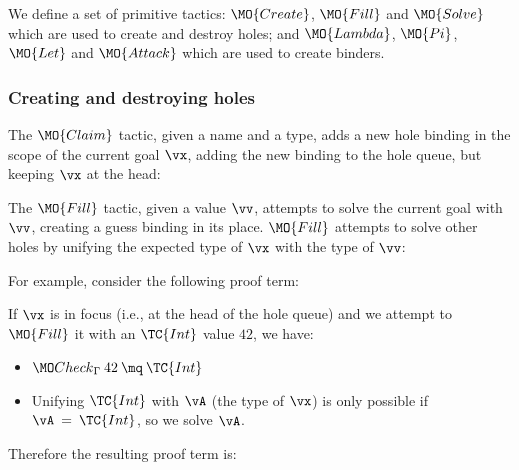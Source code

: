 We define a set of primitive tactics: $\MO{Create}$, $\MO{Fill}$ and $\MO{Solve}$
which are used to create and destroy holes; and $\MO{Lambda}$, $\MO{Pi}$, $\MO{Let}$
and $\MO{Attack}$ which are used to create binders.

\subsubsection{Creating and destroying holes}

The $\MO{Claim}$ tactic, given a name and a type, adds a new hole binding in
the scope of the current goal $\vx$, adding the new binding to the hole queue, but
keeping $\vx$ at the head:


The $\MO{Fill}$ tactic, given a value $\vv$, attempts to solve the current goal
with $\vv$, creating a guess binding in its place. $\MO{Fill}$ attempts to
solve other holes by unifying the expected type of $\vx$ with the type of $\vv$:


\noindent
For example, consider the following proof term:

\DM{
\AR{
\hole{\vA}{\Set}\SC\hole{\vk}{\Nat}\SC
\hole{\vx}{\vA}\SC\hole{\vxs}{\Vect\:\vA\:\vk}\SC
\\
\hole{\vys}{\Vect\:\vA\:(\suc\:\vk)}\SC\vys
}
}

\noindent
If $\vx$ is in focus (i.e., at the head of the hole queue) and we attempt to
$\MO{Fill}$ it with an $\TC{Int}$ value $42$, we have:

\begin{itemize}
\item $\Check\:42\:\mq\:\TC{Int}$
\item Unifying $\TC{Int}$ with $\vA$ (the type of $\vx$) is only possible if
$\vA\:=\:\TC{Int}$, so we solve $\vA$.
\end{itemize}

\noindent
Therefore the resulting proof term is:


